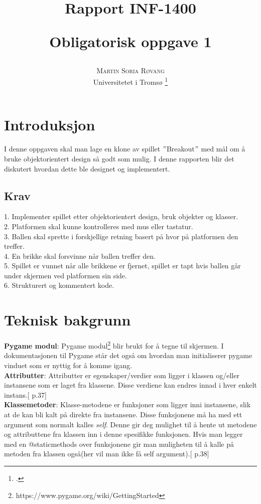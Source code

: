 \documentclass{article}     %
\title{\vspace{-3.5cm}}
\title{
 \vspace{-3.5cm} Rapport INF-1400 \\ 
\begin{large} 
  Obligatorisk oppgave 1
\end{large} }
\author{%
	\large
	\textsc{Martin Soria Røvang}\\
	\normalsize	Universitetet i Troms{\o}
	\footnote{.} \\
	\vspace{-5mm}
	}
\begin{document}
\maketitle   %



\section{Introduksjon}
I denne oppgaven skal man lage en klone av spillet $"$Breakout$"$ med mål om å bruke objektorientert design så godt som mulig. I denne rapporten blir det diskutert hvordan dette ble designet og implementert.

\subsection{Krav}
1. Implementer spillet etter objektorientert design, bruk objekter og klasser.\\
2. Platformen skal kunne kontrolleres med mus eller tastatur.\\
3. Ballen skal sprette i forskjellige retning basert på hvor på platformen den treffer.\\
4. En brikke skal forsvinne når ballen treffer den.\\
5. Spillet er vunnet når alle brikkene er fjernet, spillet er tapt hvis ballen går under skjermen ved platformen sin side.\\
6. Strukturert og kommentert kode.


\section{Teknisk bakgrunn}

\textbf{Pygame modul}: Pygame modul\footnote{https://www.pygame.org/wiki/GettingStarted} blir brukt for å tegne til skjermen. I dokumentasjonen til Pygame står det også om hvordan man initialiserer pygame vinduet som er nyttig for å komme igang.\\
\textbf{Attributter}: Attributter er egenskaper/verdier som ligger i klassen og/eller instansene som er laget fra klassene. Disse verdiene kan endres innad i hver enkelt instans.[\cite{Dustyphil} p.37]\\
\textbf{Klassemetoder}: Klasse-metodene er funksjoner som ligger inni instansene, slik at de kan bli kalt på direkte fra instansene. Disse funksjonene må ha med ett argument som normalt kalles \emph{self}. Denne gir deg mulighet til å hente ut metodene og attributtene fra klassen inn i denne spesifikke funksjonen. Hvis man legger med en @staticmethods over funksjonene gir man muligheten til å kalle på metoden fra klassen også(her vil man ikke få self argument).[\cite{Dustyphil} p.38]
\end{document}

